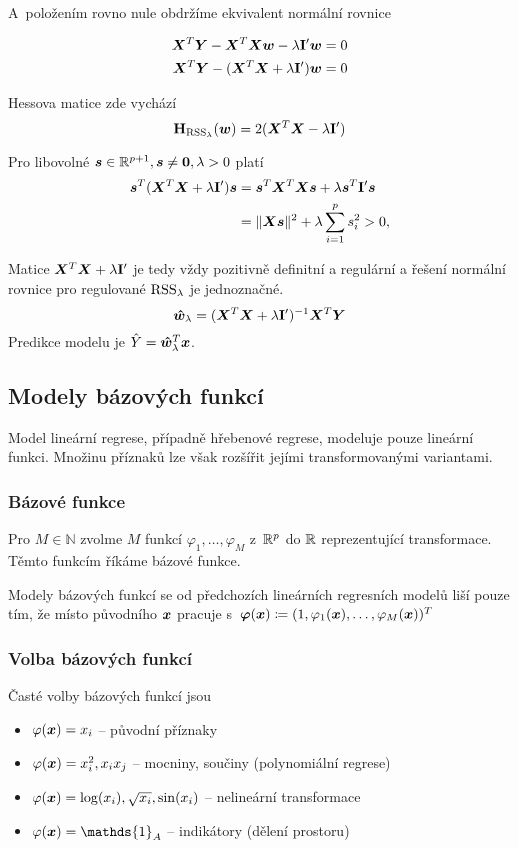 A~položením rovno nule obdržíme ekvivalent normální rovnice

\begin{align*}
    \bm{X}^T\bm{Y} - \bm{X}^T\bm{X}\bm{w} - \lambda \mathbf{I}' \bm{w} & = 0 \\
    \bm{X}^T\bm{Y} - (\bm{X}^T\bm{X} + \lambda \mathbf{I}') \bm{w}  & = 0
\end{align*}

Hessova matice zde vychází
\[
    \textbf{H}_{\operatorname{RSS}_\lambda}(\bm{w}) = 2(\bm{X}^T\bm{X} - \lambda \mathbf{I}')
\]

Pro libovolné $\bm{s} \in \mathbb{R}^{p+1}, \bm{s} \ne \bm{0}, \lambda > 0$ platí
\begin{align*}
    \bm{s}^T(\bm{X}^T\bm{X} + \lambda \mathbf{I}')\bm{s}
     & = \bm{s}^T \bm{X}^T\bm{X} \bm{s} + \lambda \bm{s}^T \mathbf{I}' \bm{s} \\
     & = \| \bm{X} \bm{s} \|^2 + \lambda \sum_{i=1}^{p} s_i^2 > 0,
\end{align*}

Matice $\bm{X}^T\bm{X} + \lambda \mathbf{I}'$ je tedy vždy pozitivně definitní a regulární a řešení normální rovnice pro regulované $\operatorname{RSS}_\lambda$ je jednoznačné.
\[\bm{\hat{w}}_\lambda = (\bm{X}^T\bm{X} + \lambda \mathbf{I}')^{-1} \bm{X}^T\bm{Y}\]
Predikce modelu je $\hat{Y} = \bm{\hat{w}}_\lambda^T\bm{x}$.

\subsection{Modely bázových funkcí}

Model lineární regrese, případně hřebenové regrese, modeluje pouze lineární funkci. Množinu příznaků lze však rozšířit jejími transformovanými variantami.

\subsubsection{Bázové funkce}

Pro $M \in \mathbb{N}$ zvolme $M$ funkcí $\varphi_1, \ldots, \varphi_M$ z~$\mathbb{R}^{p}$ do $\mathbb{R}$ reprezentující transformace. Těmto funkcím říkáme bázové funkce.

Modely bázových funkcí se od předchozích lineárních regresních modelů liší pouze tím, že místo původního $\bm{x}$ pracuje s~$\bm{\varphi}(\bm{x})  \coloneqq (1, \varphi_1(\bm{x}), \ldots, \varphi_M(\bm{x}))^T$

\subsubsection{Volba bázových funkcí}

Časté volby bázových funkcí jsou
\begin{itemize}
    \item $\varphi(\bm{x}) = x_i$ -- původní příznaky
    \item $\varphi(\bm{x}) = x_i^2, x_i x_j$ -- mocniny, součiny (polynomiální regrese)
    \item $\varphi(\bm{x}) = \log(x_i), \sqrt{x_i}, \sin(x_i)$ -- nelineární transformace
    \item $\varphi(\x) = \mathds{1}_{A}$ -- indikátory (dělení prostoru)
\end{itemize}

